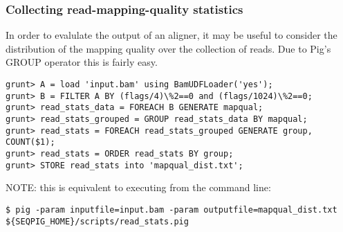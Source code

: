 \subsubsection{Collecting read-mapping-quality statistics}
In order to evalulate the output of an aligner, it may be useful to
consider the distribution of the mapping quality over the collection of
reads. Due to Pig's GROUP operator this is fairly easy.
\begin{lstlisting}
grunt> A = load 'input.bam' using BamUDFLoader('yes');
grunt> B = FILTER A BY (flags/4)\%2==0 and (flags/1024)\%2==0;
grunt> read_stats_data = FOREACH B GENERATE mapqual;
grunt> read_stats_grouped = GROUP read_stats_data BY mapqual;
grunt> read_stats = FOREACH read_stats_grouped GENERATE group, COUNT($1);
grunt> read_stats = ORDER read_stats BY group;
grunt> STORE read_stats into 'mapqual_dist.txt';
\end{lstlisting}
NOTE: this is equivalent to executing from the command line:
\begin{lstlisting}
$ pig -param inputfile=input.bam -param outputfile=mapqual_dist.txt ${SEQPIG_HOME}/scripts/read_stats.pig
\end{lstlisting}

